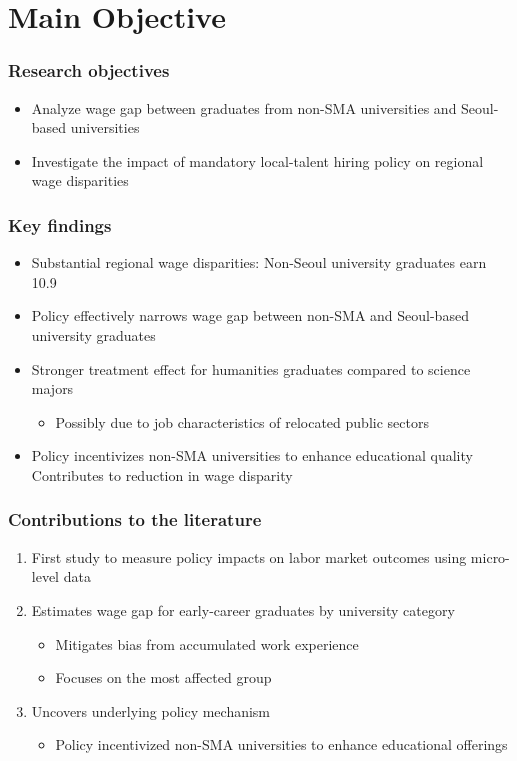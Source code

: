 \documentclass[aspectratio=169,xcolor=dvipsnames,handout]{beamer}
\begin{document}
\section{Main Objective}
\begin{frame}
    \frametitle{Research objectives}
    \begin{itemize}[<+->]
        \item Analyze wage gap between graduates from non-SMA universities and Seoul-based universities
        \item Investigate the impact of mandatory local-talent hiring policy on regional wage disparities
    \end{itemize}
\end{frame}

\begin{frame}
    \frametitle{Key findings}
    \begin{itemize}[<+->]
        \item Substantial regional wage disparities: Non-Seoul university graduates earn 10.9%
        \item Policy effectively narrows wage gap between non-SMA and Seoul-based university graduates
        \item Stronger treatment effect for humanities graduates compared to science majors 
        \begin{itemize}[<+->]
            \item Possibly due to job characteristics of relocated public sectors
        \end{itemize}
        \item Policy incentivizes non-SMA universities to enhance educational quality Contributes to reduction in wage disparity
    \end{itemize}
\end{frame}

\begin{frame}
    \frametitle{Contributions to the literature}
    \begin{enumerate}[<+->]
        \item First study to measure policy impacts on labor market outcomes using micro-level data
        \item Estimates wage gap for early-career graduates by university category
        \begin{itemize}[<+->]
            \item Mitigates bias from accumulated work experience
            \item Focuses on the most affected group
        \end{itemize}
        \item Uncovers underlying policy mechanism
        \begin{itemize}[<+->]
            \item Policy incentivized non-SMA universities to enhance educational offerings
        \end{itemize}
    \end{enumerate}
\end{frame}
\end{document}

